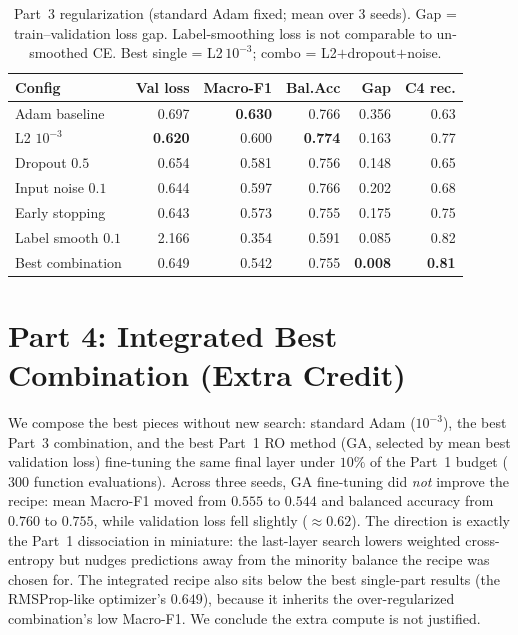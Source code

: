 \documentclass[letterpaper, 10pt, conference]{ieeeconf}
\begin{document}
\begin{table}[t]
\caption{Part~3 regularization (standard Adam fixed; mean over 3 seeds). Gap =
  train--validation loss gap. Label-smoothing loss is not comparable to
  un-smoothed CE. Best single = L2\,$10^{-3}$; combo = L2$+$dropout$+$noise.}
\label{tab:part3}
\centering\small
\begin{tabular}{@{}lrrrrr@{}}
\toprule
Config & Val loss & Macro-F1 & Bal.Acc & Gap & C4 rec. \\
\midrule
Adam baseline      & 0.697 & \textbf{0.630} & 0.766 & 0.356 & 0.63 \\
L2 $10^{-3}$       & \textbf{0.620} & 0.600 & \textbf{0.774} & 0.163 & 0.77 \\
Dropout $0.5$      & 0.654 & 0.581 & 0.756 & 0.148 & 0.65 \\
Input noise $0.1$  & 0.644 & 0.597 & 0.766 & 0.202 & 0.68 \\
Early stopping     & 0.643 & 0.573 & 0.755 & 0.175 & 0.75 \\
Label smooth $0.1$ & 2.166 & 0.354 & 0.591 & 0.085 & 0.82 \\
Best combination   & 0.649 & 0.542 & 0.755 & \textbf{0.008} & \textbf{0.81} \\
\bottomrule
\end{tabular}
\end{table}

\section{Part 4: Integrated Best Combination (Extra Credit)}
\label{sec:part4}

We compose the best pieces without new search: standard Adam ($10^{-3}$), the
best Part~3 combination, and the best Part~1 RO method (GA, selected by mean best
validation loss) fine-tuning the same final layer under $10\%$ of the Part~1
budget ($300$ function evaluations). Across three seeds, GA fine-tuning did
\emph{not} improve the recipe: mean Macro-F1 moved from $0.555$ to $0.544$ and
balanced accuracy from $0.760$ to $0.755$, while validation loss fell slightly
($\approx\!0.62$). The direction is exactly the Part~1 dissociation in miniature:
the last-layer search lowers weighted cross-entropy but nudges predictions away
from the minority balance the recipe was chosen for. The integrated recipe also
sits below the best single-part results (the RMSProp-like optimizer's $0.649$),
because it inherits the over-regularized combination's low Macro-F1. We conclude
the extra compute is not justified.
\end{document}
